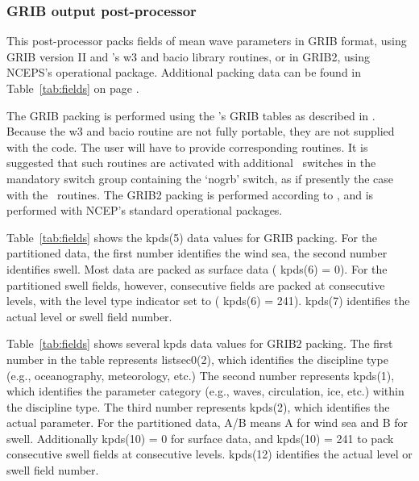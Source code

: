 \pb
\vsssub
\subsubsection{GRIB output post-processor} \label{sec:post_g}
\vsssub



\vspace{\baselineskip} 
\noindent
This post-processor packs fields of mean wave parameters in GRIB format, using
GRIB version II and \ncep's w3 and bacio library routines, or in GRIB2, using
NCEPS's operational package. Additional packing data can be found in
Table~\ref{tab:fields} on page \pageref{tab:fields}.

The GRIB packing is performed using the \ncep's GRIB tables as described in
\cite{rep:GRIB}. Because the w3 and bacio routine are not fully portable, they
are not supplied with the code. The user will have to provide corresponding
routines. It is suggested that such routines are activated with additional
\ws\ switches in the mandatory switch group containing the `{\F nogrb}'
switch, as if presently the case with the \ncep\ routines.  The GRIB2 packing
is performed according to \cite{rep:GRIB2}, and is performed with NCEP's
standard operational packages.

Table~\ref{tab:fields} shows the {\F kpds(5)} data values for GRIB
packing. For the partitioned data, the first number identifies the wind sea,
the second number identifies swell. Most data are packed as surface data ({\F
kpds(6) = 0}). For the partitioned swell fields, however, consecutive fields
are packed at consecutive levels, with the level type indicator set to ({\F
kpds(6) = 241}). {\F kpds(7)} identifies the actual level or swell field
number.

Table~\ref{tab:fields} shows several {\F kpds} data values for GRIB2
packing. The first number in the table represents {\F listsec0(2)}, which
identifies the discipline type (e.g., oceanography, meteorology, etc.)  The
second number represents {\F kpds(1)}, which identifies the parameter category
(e.g., waves, circulation, ice, etc.) within the discipline type.  The third
number represents {\F kpds(2)}, which identifies the actual parameter.  For
the partitioned data, A/B means A for wind sea and B for swell.  Additionally
{\F kpds(10) = 0} for surface data, and {\F kpds(10) = 241 } to pack
consecutive swell fields at consecutive levels. {\F kpds(12)} identifies the
actual level or swell field number.

